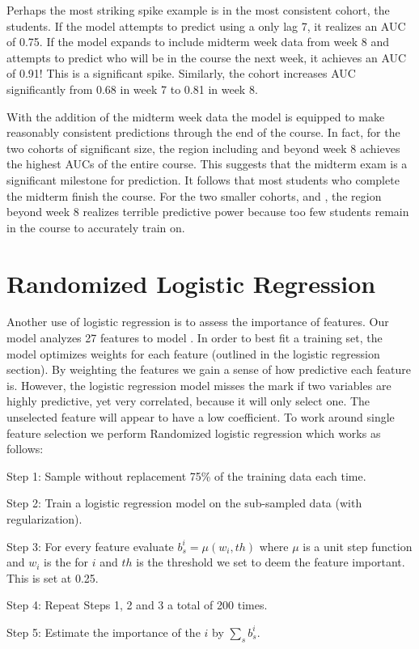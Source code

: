 Perhaps the most striking spike example is in the most consistent cohort, the \neither students. If the model attempts to predict using a only lag 7, it realizes an AUC of 0.75. If the model expands to include midterm week data from week 8 and attempts to predict who will be in the course the next week, it achieves an AUC of 0.91! This is a significant spike. Similarly, the \both cohort increases AUC significantly from 0.68 in week 7 to 0.81 in week 8.

With the addition of the midterm week data the model is equipped to make reasonably consistent predictions through the end of the course. In fact, for the two cohorts of significant size, the region including and beyond week 8 achieves the highest AUCs of the entire course. This suggests that the midterm exam is a significant milestone for \sti prediction. It follows that most students who complete the midterm finish the course. For the two smaller cohorts, \wiki and \both, the region beyond week 8 realizes terrible predictive power because too few students remain in the course to accurately train on.

\section{Randomized Logistic Regression}
Another use of logistic regression is to assess the importance of features. Our model analyzes 27 features to model \sti. In order to best fit a training set, the model optimizes weights for each feature (outlined in the logistic regression section). By weighting the features we gain a sense of how predictive each feature is. However, the logistic regression model misses the mark if two variables are highly predictive, yet very correlated, because it will only select one. The unselected feature will appear to have a low coefficient. To work around single feature selection we perform Randomized logistic regression which works as follows: 

\begin{description}
\item {Step 1:} Sample without replacement  75\% of the training data each time. 

\item {Step 2:} Train a logistic regression model on the sub-sampled data (with regularization).

\item {Step 3:} For every feature evaluate $b_s^{i}=\mu(w_i,th)$ where $\mu$ is a unit step function and $w_i$ is the \coeff for \co $i$ and $th$ is the threshold we set to deem the feature important. This is set at 0.25. 

\item {Step 4:} Repeat Steps 1, 2 and 3 a total of 200 times. 

\item {Step 5:} Estimate the importance of the \co $i$ by $\sum_s b_s^{i}$. 

\end{description}

